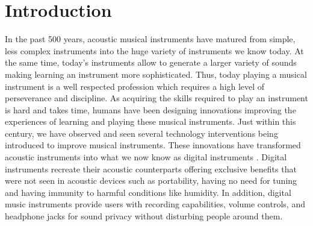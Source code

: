 \documentclass[sigconf, screen, review]{acmart}
\begin{document}
\maketitle

\section{Introduction}
In the past 500 years, acoustic musical instruments have matured from simple, less complex instruments into the huge variety of instruments we know today. At the same time, today's instruments allow to generate a larger variety of sounds making learning an instrument more sophisticated. Thus, today playing a musical instrument is a well respected profession which requires a high level of perseverance and discipline. As acquiring the skills required to play an instrument is hard and takes time, humans have been designing innovations improving the experiences of learning and playing these musical instruments. Just within this century, we have observed and seen several technology interventions being introduced to improve musical instruments. These innovations have transformed acoustic instruments into what we now know as digital instruments \cite{magnusson2007acoustic}. Digital instruments recreate their acoustic counterparts offering exclusive benefits that were not seen in acoustic devices such as portability, having no need for tuning and having immunity to harmful conditions like humidity. In addition, digital music instruments provide users with recording capabilities, volume controls, and headphone jacks for sound privacy without disturbing people around them. 
\end{document}
